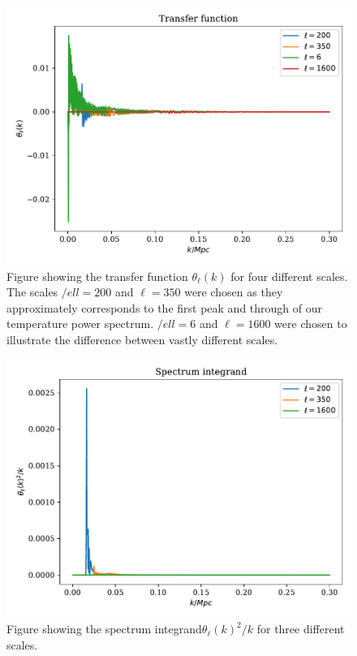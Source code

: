 \documentclass[onecolumn]{aastex62}
\begin{document}
\begin{figure}
    \includegraphics[scale=0.8]{figures/transfer.pdf}
    \caption{Figure showing the transfer function $\theta_\ell(k)$ for four different scales. The scales $/ell=200$ and
    $\ell=350$ were chosen as they approximately corresponds to the first peak and through of
    our temperature power spectrum. $/ell=6$ and $\ell=1600$ were chosen to
    illustrate the difference between vastly different scales.}
    \label{fig:transfer}
\end{figure}
\begin{figure}
    \includegraphics[scale=0.8]{figures/integrand.pdf}
    \caption{Figure showing the spectrum integrand$\theta_\ell(k)^2/k$ for three different scales.}
    \label{fig:integrand}
\end{figure}
\end{document}
